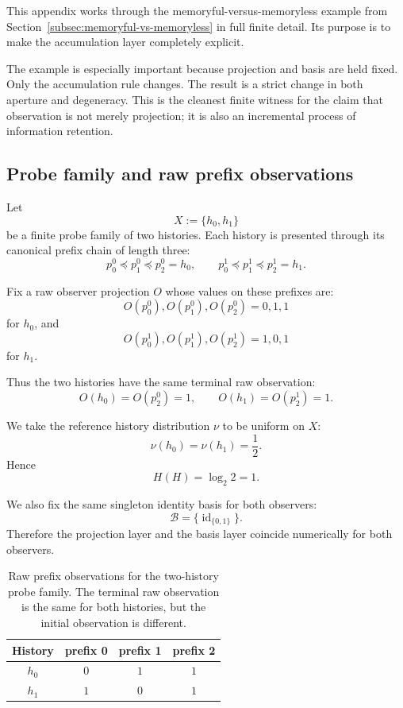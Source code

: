\documentclass[11pt,twoside]{article}
\newcommand{\TableHeaderRow}{\rowcolor{tableheaderbg}\bfseries}
\theoremstyle{definition}
\begin{document}
This appendix works through the memoryful-versus-memoryless example from Section~\ref{subsec:memoryful-vs-memoryless} in full finite detail. Its purpose is to make the accumulation layer completely explicit.

The example is especially important because projection and basis are held fixed. Only the accumulation rule changes. The result is a strict change in both aperture and degeneracy. This is the cleanest finite witness for the claim that observation is not merely projection; it is also an incremental process of information retention.

\subsection{Probe family and raw prefix observations}
\label{app:memory-setup}

Let
\[
  X := \{ h_0, h_1 \}
\]
be a finite probe family of two histories. Each history is presented through its canonical prefix chain of length three:
\[
  p^0_0 \preceq p^0_1 \preceq p^0_2 = h_0,
  \qquad
  p^1_0 \preceq p^1_1 \preceq p^1_2 = h_1.
\]

Fix a raw observer projection \(O\) whose values on these prefixes are:
\[
  O(p^0_0), O(p^0_1), O(p^0_2) = 0,1,1
\]
for \(h_0\), and
\[
  O(p^1_0), O(p^1_1), O(p^1_2) = 1,0,1
\]
for \(h_1\).

Thus the two histories have the same terminal raw observation:
\[
  O(h_0)=O(p^0_2)=1,
  \qquad
  O(h_1)=O(p^1_2)=1.
\]

We take the reference history distribution \(\nu\) to be uniform on \(X\):
\[
  \nu(h_0)=\nu(h_1)=\frac12.
\]
Hence
\[
  H(H)=\log_2 2 = 1.
\]

We also fix the same singleton identity basis for both observers:
\[
  \mathcal{B} = \{ \operatorname{id}_{\{0,1\}} \}.
\]
Therefore the projection layer and the basis layer coincide numerically for both observers.

\begin{table}[t]
\centering
\begin{tabular}{c c c c}
\toprule
\TableHeaderRow
History & prefix 0 & prefix 1 & prefix 2 \\
\midrule
\(h_0\) & \(0\) & \(1\) & \(1\) \\
\(h_1\) & \(1\) & \(0\) & \(1\) \\
\bottomrule
\end{tabular}
\caption{Raw prefix observations for the two-history probe family. The terminal raw observation is the same for both histories, but the initial observation is different.}
\label{tab:memory-prefix-observations}
\end{table}
\end{document}
